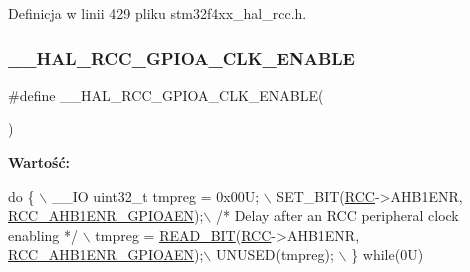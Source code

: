 Definicja w linii 429 pliku stm32f4xx\+\_\+hal\+\_\+rcc.\+h.

\mbox{\label{group___r_c_c___a_h_b1___clock___enable___disable_ga1fde58d775fd2458002df817a68f486e}} 
\subsubsection{\texorpdfstring{\+\_\+\+\_\+\+H\+A\+L\+\_\+\+R\+C\+C\+\_\+\+G\+P\+I\+O\+A\+\_\+\+C\+L\+K\+\_\+\+E\+N\+A\+B\+LE}{\_\_HAL\_RCC\_GPIOA\_CLK\_ENABLE}}
{\footnotesize\ttfamily \#define \+\_\+\+\_\+\+H\+A\+L\+\_\+\+R\+C\+C\+\_\+\+G\+P\+I\+O\+A\+\_\+\+C\+L\+K\+\_\+\+E\+N\+A\+B\+LE(\begin{DoxyParamCaption}{ }\end{DoxyParamCaption})}

{\bfseries Wartość\+:}
\begin{DoxyCode}
\textcolor{keywordflow}{do} \{ \(\backslash\)
                                        \_\_IO uint32\_t tmpreg = 0x00U; \(\backslash\)
                                        SET\_BIT(\hyperlink{group___peripheral__declaration_ga74944438a086975793d26ae48d5882d4}{RCC}->AHB1ENR, 
      \hyperlink{group___peripheral___registers___bits___definition_ga6ff46fb3b30fc6792e4fd18fcb0941b5}{RCC\_AHB1ENR\_GPIOAEN});\(\backslash\)
                                        \textcolor{comment}{/* Delay after an RCC peripheral clock enabling */} \(\backslash\)
                                        tmpreg = \hyperlink{group___exported__macro_ga822bb1bb9710d5f2fa6396b84e583c33}{READ\_BIT}(\hyperlink{group___peripheral__declaration_ga74944438a086975793d26ae48d5882d4}{RCC}->AHB1ENR, 
      \hyperlink{group___peripheral___registers___bits___definition_ga6ff46fb3b30fc6792e4fd18fcb0941b5}{RCC\_AHB1ENR\_GPIOAEN});\(\backslash\)
                                        UNUSED(tmpreg); \(\backslash\)
                                          \} \textcolor{keywordflow}{while}(0U)
\end{DoxyCode}


